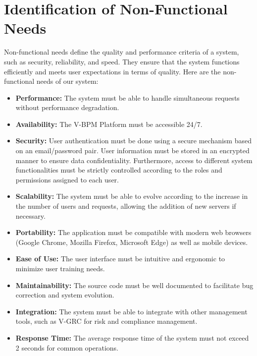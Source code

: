 \section{Identification of Non-Functional Needs}

Non-functional needs define the quality and performance criteria of a system, such as security, reliability, and speed. They ensure that the system functions efficiently and meets user expectations in terms of quality. Here are the non-functional needs of our system:

\begin{itemize}[leftmargin=1cm]
    \item \textbf{Performance:} The system must be able to handle simultaneous requests without performance degradation.
    
    \item \textbf{Availability:} The V-BPM Platform must be accessible 24/7.
    
    \item \textbf{Security:} User authentication must be done using a secure mechanism based on an email/password pair. User information must be stored in an encrypted manner to ensure data confidentiality. Furthermore, access to different system functionalities must be strictly controlled according to the roles and permissions assigned to each user.
    
    \item \textbf{Scalability:} The system must be able to evolve according to the increase in the number of users and requests, allowing the addition of new servers if necessary.
    
    \item \textbf{Portability:} The application must be compatible with modern web browsers (Google Chrome, Mozilla Firefox, Microsoft Edge) as well as mobile devices.
    
    \item \textbf{Ease of Use:} The user interface must be intuitive and ergonomic to minimize user training needs.
    
    \item \textbf{Maintainability:} The source code must be well documented to facilitate bug correction and system evolution.
    
    \item \textbf{Integration:} The system must be able to integrate with other management tools, such as V-GRC for risk and compliance management.
    
    \item \textbf{Response Time:} The average response time of the system must not exceed 2 seconds for common operations.
\end{itemize}

